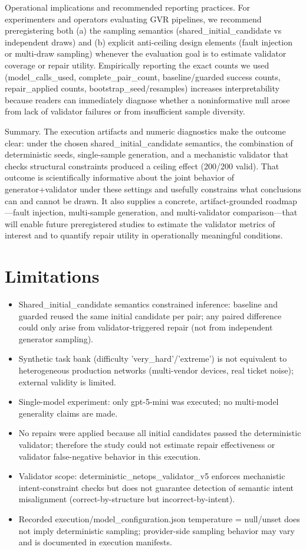 \documentclass[conference]{IEEEtran}
\begin{document}
Operational implications and recommended reporting practices. For experimenters and operators evaluating GVR pipelines, we recommend preregistering both (a) the sampling semantics (shared\_initial\_candidate vs independent draws) and (b) explicit anti-ceiling design elements (fault injection or multi-draw sampling) whenever the evaluation goal is to estimate validator coverage or repair utility. Empirically reporting the exact counts we used (model\_calls\_used, complete\_pair\_count, baseline/guarded success counts, repair\_applied counts, bootstrap\_seed/resamples) increases interpretability because readers can immediately diagnose whether a noninformative null arose from lack of validator failures or from insufficient sample diversity.

Summary. The execution artifacts and numeric diagnostics make the outcome clear: under the chosen shared\_initial\_candidate semantics, the combination of deterministic seeds, single-sample generation, and a mechanistic validator that checks structural constraints produced a ceiling effect (200/200 valid). That outcome is scientifically informative about the joint behavior of generator+validator under these settings and usefully constrains what conclusions can and cannot be drawn. It also supplies a concrete, artifact-grounded roadmap---fault injection, multi-sample generation, and multi-validator comparison---that will enable future preregistered studies to estimate the validator metrics of interest and to quantify repair utility in operationally meaningful conditions.

\section{Limitations}
\begin{itemize}
\item Shared\_initial\_candidate semantics constrained inference: baseline and guarded reused the same initial candidate per pair; any paired difference could only arise from validator-triggered repair (not from independent generator sampling).
\item Synthetic task bank (difficulty 'very\_hard'/'extreme') is not equivalent to heterogeneous production networks (multi-vendor devices, real ticket noise); external validity is limited.
\item Single-model experiment: only gpt-5-mini was executed; no multi-model generality claims are made.
\item No repairs were applied because all initial candidates passed the deterministic validator; therefore the study could not estimate repair effectiveness or validator false-negative behavior in this execution.
\item Validator scope: deterministic\_netops\_validator\_v5 enforces mechanistic intent-constraint checks but does not guarantee detection of semantic intent misalignment (correct-by-structure but incorrect-by-intent).
\item Recorded execution/model\_configuration.json temperature = null/unset does not imply deterministic sampling; provider-side sampling behavior may vary and is documented in execution manifests.
\end{itemize}
\end{document}
